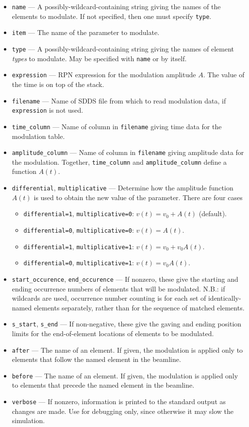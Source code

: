 \documentclass[11pt]{article}
\begin{document}
\begin{itemize}
\item \verb|name| --- A possibly-wildcard-containing string giving the names of the
        elements to modulate. If not specified, then one must specify \verb|type|.
\item \verb|item| --- The name of the parameter to modulate.
\item \verb|type| --- A possibly-wildcard-containing string giving the names of element
        {\em types} to modulate.  May be specified with \verb|name| or by itself.
\item \verb|expression| --- RPN expression for the modulation amplitude $A$.  The value
  of the time is on top of the stack. 
\item \verb|filename| --- Name of SDDS file from which to read modulation data, if
  \verb|expression| is not used.
\item \verb|time_column| --- Name of column in \verb|filename| giving time data for the
  modulation table.
\item \verb|amplitude_column| --- Name of column in \verb|filename| giving amplitude data
  for the modulation.  Together, \verb|time_column| and \verb|amplitude_column| define
  a function $A(t)$.
\item \verb|differential|, \verb|multiplicative| --- Determine how the amplitude function
  $A(t)$ is used to obtain the new value of the parameter.  There are four cases
  \begin{itemize}
    \item \verb|differential=1|, \verb|multiplicative=0|: $v(t) = v_0 + A(t)$ (default).
    \item \verb|differential=0|, \verb|multiplicative=0|: $v(t) = A(t)$.  
    \item \verb|differential=1|, \verb|multiplicative=1|: $v(t) = v_0 + v_0 A(t)$.  
    \item \verb|differential=0|, \verb|multiplicative=1|: $v(t) = v_0 A(t)$.  
  \end{itemize}
\item \verb|start_occurence|, \verb|end_occurence| --- If nonzero, these give the starting and
 ending occurrence numbers of elements that will be modulated. N.B.: if wildcards are used, occurrence
 number counting is for each set of identically-named elements separately, rather than for the sequence
 of matched elements.
\item \verb|s_start|, \verb|s_end| --- If non-negative, these give the gaving and ending position
 limits for the end-of-element locations of elements to be modulated.
\item \verb|after| --- The name of an element.  If given, the modulation is applied only to elements
 that follow the named element in the beamline.  
\item \verb|before| --- The name of an element.  If given, the modulation is applied only to elements
 that precede the named element in the beamline. 
\item \verb|verbose| --- If nonzero, information is printed to the standard output as changes are
        made.  Use for debugging only, since otherwise it may slow the simulation.
\end{itemize}
\end{document}
